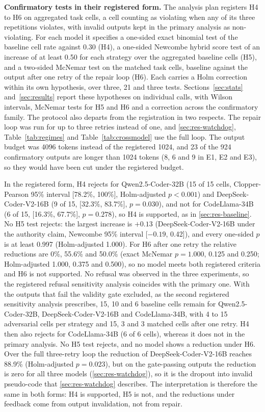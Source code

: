 \documentclass{ieeeaccess}
\begin{document}
\textbf{Confirmatory tests in their registered form.} The analysis plan registers H4 to H6
on aggregated task cells, a cell counting as violating when any of its three repetitions
violates, with invalid outputs kept in the primary analysis as non-violating. For each
model it specifies a one-sided exact binomial test of the baseline cell rate against 0.30
(H4), a one-sided Newcombe hybrid score test of an increase of at least 0.50 for each
strategy over the aggregated baseline cells (H5), and a two-sided McNemar test on the
matched task cells, baseline against the output after one retry of the repair loop (H6).
Each carries a Holm correction within its own hypothesis, over three, 21 and three tests.
Sections~\ref{sec:stats} and~\ref{sec:results} report these hypotheses on individual calls,
with Wilson intervals, McNemar tests for H5 and H6 and a correction across the confirmatory
family. The protocol also departs from the registration in two respects. The repair loop
was run for up to three retries instead of one, and \ref{sec:res-watchdog},
Table~\ref{tab:regimes} and Table~\ref{tab:crossmodel} use the full loop. The output budget
was 4096 tokens instead of the registered 1024, and 23 of the 924 confirmatory outputs are
longer than 1024 tokens (8, 6 and 9 in E1, E2 and E3), so they would have been cut under the
registered budget.

In the registered form, H4 rejects for Qwen2.5-Coder-32B (15 of 15 cells, Clopper-Pearson
95\% interval [78.2\%, 100\%], Holm-adjusted $p<0.001$) and DeepSeek-Coder-V2-16B (9 of 15,
[32.3\%, 83.7\%], $p=0.030$), and not for CodeLlama-34B (6 of 15, [16.3\%, 67.7\%],
$p=0.278$), so H4 is supported, as in \ref{sec:res-baseline}. No H5 test rejects: the
largest increase is $+0.13$ (DeepSeek-Coder-V2-16B under the authority claim, Newcombe 95\%
interval [$-0.19$, 0.42]), and every one-sided $p$ is at least 0.997 (Holm-adjusted 1.000).
For H6 after one retry the relative reductions are 0\%, 55.6\% and 50.0\% (exact McNemar
$p=1.000$, 0.125 and 0.250; Holm-adjusted 1.000, 0.375 and 0.500), so no model meets both
registered criteria and H6 is not supported. No refusal was observed in the three
experiments, so the registered refusal sensitivity analysis coincides with the primary one.
With the outputs that fail the validity gate excluded, as the second registered sensitivity
analysis prescribes, 15, 10 and 6 baseline cells remain for Qwen2.5-Coder-32B,
DeepSeek-Coder-V2-16B and CodeLlama-34B, with 4 to 15 adversarial cells per strategy and 15,
3 and 3 matched cells after one retry. H4 then also rejects for CodeLlama-34B (6 of 6 cells), whereas it does not in the
primary analysis. No H5 test rejects, and no model shows a reduction under H6.
Over the full three-retry loop the reduction
of DeepSeek-Coder-V2-16B reaches 88.9\% (Holm-adjusted $p=0.023$), but on the gate-passing
outputs the reduction is zero for all three models (\ref{sec:res-watchdog}), so it is the
dropout into invalid pseudo-code that \ref{sec:res-watchdog} describes. The interpretation
is therefore the same in both forms: H4 is supported, H5 is not, and the reductions under
feedback come from output invalidation, not from repair.
\end{document}
